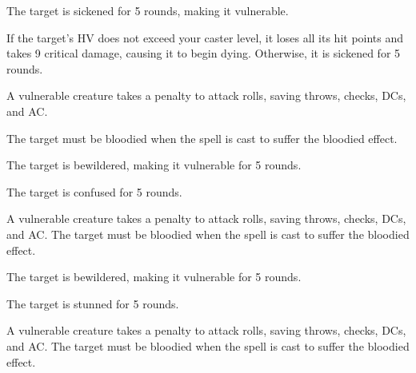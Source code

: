 \spellrng{\rngclose}
\begin{spellhealthy}
  The target is sickened for 5 rounds, making it vulnerable.
\end{spellhealthy}
\begin{spellblood}
  If the target's HV does not exceed your caster level, it loses all its hit points and takes 9 critical damage, causing it to begin dying. Otherwise, it is sickened for 5 rounds.
\end{spellblood}
\begin{spellnotes}
  A vulnerable creature takes a  penalty to attack rolls, saving throws, checks, DCs, and AC.

  The target must be bloodied when the spell is cast to suffer the bloodied effect.
\end{spellnotes}

\spellrng{\rngclose}
\begin{spellhealthy}
  The target is bewildered, making it vulnerable for 5 rounds.
\end{spellhealthy}
\begin{spellblood}
  The target is confused for 5 rounds. \confusionexplanation
\end{spellblood}
\begin{spellnotes}
  A vulnerable creature takes a  penalty to attack rolls, saving throws, checks, DCs, and AC.
  The target must be bloodied when the spell is cast to suffer the bloodied effect.
\end{spellnotes}

\spellrng{\rngclose}
\begin{spellhealthy}
  The target is bewildered, making it vulnerable for 5 rounds.
\end{spellhealthy}
\begin{spellblood}
  The target is stunned for 5 rounds.
\end{spellblood}
\begin{spellnotes}
  A vulnerable creature takes a  penalty to attack rolls, saving throws, checks, DCs, and AC.
  The target must be bloodied when the spell is cast to suffer the bloodied effect.
\end{spellnotes}

